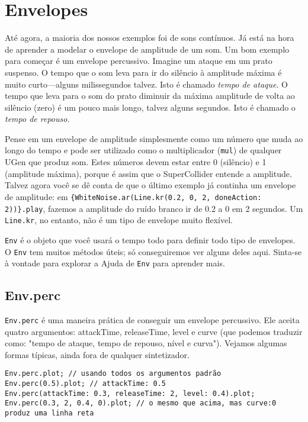 \section{Envelopes}

Até agora, a maioria dos nossos exemplos foi de sons contínuos. Já está na hora de aprender a modelar o envelope de amplitude de um som. Um bom exemplo para começar é um envelope percussivo. Imagine um ataque em um prato suspenso. O tempo que o som leva para ir do silêncio à amplitude máxima é muito curto---alguns milissegundos talvez. Isto é chamado \emph{tempo de ataque}. O tempo que leva para o som do prato diminuir da máxima amplitude de volta ao silêncio (zero) é um pouco mais longo, talvez alguns segundos. Isto é chamado o \emph{tempo de repouso}.

Pense em um envelope de amplitude simplesmente como um número que muda ao longo do tempo e pode ser utilizado como o multiplicador (\texttt{mul}) de qualquer UGen que produz som. Estes números devem estar entre 0 (silêncio) e 1 (amplitude máxima), porque é assim que o SuperCollider entende a amplitude. Talvez agora você se dê conta de que o último exemplo já continha um envelope de amplitude: em \texttt{\{WhiteNoise.ar(Line.kr(0.2, 0, 2, doneAction: 2))\}.play}, fazemos a amplitude do ruído branco ir de 0.2 a 0 em 2 segundos. Um \texttt{Line.kr}, no entanto, não é um tipo de envelope muito flexível.

\texttt{Env} é o objeto que você usará o tempo todo para definir todo tipo de envelopes. O \texttt{Env} tem muitos métodos úteis; só conseguiremos ver alguns deles aqui. Sinta-se à vontade para explorar a Ajuda de \texttt{Env} para aprender mais. 

\subsection{Env.perc}

\texttt{Env.perc} é uma maneira prática de conseguir um envelope percussivo. Ele aceita quatro argumentos:  attackTime, releaseTime, level e curve (que podemos traduzir como: "tempo de ataque, tempo de repouso, nível e curva"). Vejamos algumas formas típicas, ainda fora de qualquer sintetizador.

\begin{lstlisting}[style=SuperCollider-IDE, basicstyle=\scttfamily\footnotesize]
Env.perc.plot; // usando todos os argumentos padrão
Env.perc(0.5).plot; // attackTime: 0.5
Env.perc(attackTime: 0.3, releaseTime: 2, level: 0.4).plot;
Env.perc(0.3, 2, 0.4, 0).plot; // o mesmo que acima, mas curve:0 produz uma linha reta
\end{lstlisting}
 
